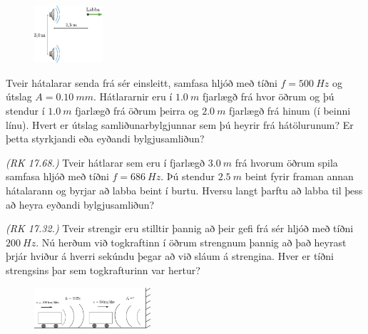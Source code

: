 \begin{enumerate}[label = \textbf{Dæmi \thechapter.\arabic*.}]
\begin{minipage}{\linewidth}
\end{minipage}

\begin{minipage}{\linewidth}

\begin{figure}
\includegraphics[width = 1in]{figures/micron.pdf}
\end{figure}

\item Tveir hátalarar senda frá sér einsleitt, samfasa hljóð með tíðni $f = \SI{500}{Hz}$ og útslag $A = \SI{0.10}{mm}$. Hátlararnir eru í $\SI{1.0}{m}$ fjarlægð frá hvor öðrum og þú stendur í $\SI{1.0}{m}$ fjarlægð frá öðrum þeirra og $\SI{2.0}{m}$ fjarlægð frá hinum (í beinni línu). Hvert er útslag samliðunarbylgjunnar sem þú heyrir frá hátölurunum? Er þetta styrkjandi eða eyðandi bylgjusamliðun?

\item \textit{(RK 17.68.)} Tveir hátlarar sem eru í fjarlægð $\SI{3.0}{m}$ frá hvorum öðrum spila samfasa hljóð með tíðni $f = \SI{686}{Hz}$. Þú stendur $\SI{2.5}{m}$ beint fyrir framan annan hátalarann og byrjar að labba beint í burtu. Hversu langt þarftu að labba til þess að heyra eyðandi bylgjusamliðun?


\end{minipage}



\item \textit{(RK 17.32.)} Tveir strengir eru stilltir þannig að þeir gefi frá sér hljóð með tíðni $\SI{200}{Hz}$. Nú herðum við togkraftinn í öðrum strengnum þannig að það heyrast þrjár hviður á hverri sekúndu þegar að við sláum á strengina. Hver er tíðni strengsins þar sem togkrafturinn var hertur?

\begin{minipage}{\linewidth}

\begin{figure}
\vspace{-0.75cm}
\includegraphics[width = 1.7in]{figures/eftirfor-irodov.pdf}
\end{figure}


\end{minipage}
\end{enumerate}
